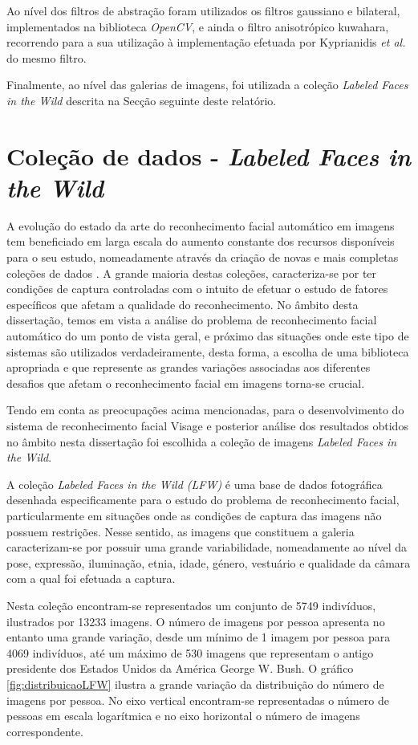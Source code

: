 Ao nível dos filtros de abstração foram utilizados os filtros gaussiano e bilateral, implementados na biblioteca \textit{OpenCV}, e ainda o filtro anisotrópico kuwahara, recorrendo para a sua utilização à implementação efetuada por Kyprianidis \textit{et al.} \cite{Kyprianidis2009} do mesmo filtro.

Finalmente, ao nível das galerias de imagens, foi utilizada a coleção \textit{Labeled Faces in the Wild} descrita na Secção seguinte deste relatório.


\section{Coleção de dados - \textit{Labeled Faces in the Wild}} \label{sec:lfw}

A evolução do estado da arte do reconhecimento facial automático em imagens tem beneficiado em larga escala do aumento constante dos recursos disponíveis para o seu estudo, nomeadamente através da criação de novas e mais completas coleções de dados \cite{Huang2007}. A grande maioria destas coleções, caracteriza-se por ter condições de captura controladas com o intuito de efetuar o estudo de fatores específicos que afetam a qualidade do reconhecimento. No âmbito desta dissertação, temos em vista a análise do problema de reconhecimento facial automático do um ponto de vista geral, e próximo das situações onde este tipo de sistemas são utilizados verdadeiramente, desta forma, a escolha de uma biblioteca apropriada e que represente as grandes variações associadas aos diferentes desafios que afetam o reconhecimento facial em imagens torna-se crucial.

Tendo em conta as preocupações acima mencionadas, para o desenvolvimento do sistema de reconhecimento facial  Visage e posterior análise dos resultados obtidos no âmbito nesta dissertação foi escolhida a coleção de imagens \textit{Labeled Faces in the Wild}.

A coleção \textit{Labeled Faces in the Wild (LFW)} é uma base de dados fotográfica desenhada especificamente para o estudo do problema de reconhecimento facial, particularmente em situações onde as condições de captura das imagens não possuem restrições. Nesse sentido, as imagens que constituem a galeria caracterizam-se por possuir uma grande variabilidade, nomeadamente ao nível da pose, expressão, iluminação, etnia, idade, género, vestuário e qualidade da câmara com a qual foi efetuada a captura\cite{Huang2007}.

Nesta coleção encontram-se representados um conjunto de 5749 indivíduos, ilustrados por 13233 imagens. O número de imagens por pessoa apresenta no entanto uma grande variação, desde um mínimo de 1 imagem por pessoa para 4069 indivíduos, até um máximo de 530 imagens que representam o antigo presidente dos Estados Unidos da América George W. Bush. O gráfico \ref{fig:distribuicaoLFW} ilustra a grande variação da distribuição do número de imagens por pessoa. No eixo vertical encontram-se representadas o número de pessoas em escala logarítmica e no eixo horizontal o número de imagens correspondente.

